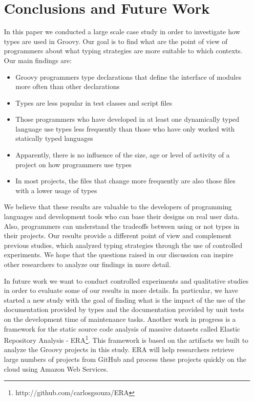 \documentclass[]{sigplanconf}
\begin{document}
\section{Conclusions and Future Work\label{conclusion}}
In this paper we conducted a large scale case study in order to investigate how types are used in Groovy.
Our goal is to find what are the point of view of programmers about what typing strategies are more suitable to which contexts.
Our main findings are:
\begin{itemize}
	\item Groovy programmers type declarations that define the interface of modules more often than other declarations
	\item Types are less popular in test classes and script files
	\item Those programmers who have developed in at least one dynamically typed language use types less frequently than those who have only worked with statically typed languages
	\item Apparently, there is no influence of the size, age or level of activity of a project on how programmers use types
	\item In most projects, the files that change more frequently are also those files with a lower usage of types
\end{itemize}

We believe that these results are valuable to the developers of programming languages and development tools who can base their designs on real user data.
Also, programmers can understand the tradeoffs between using or not types in their projects.
Our results provide a different point of view and complement previous studies, which analyzed typing strategies through the use of controlled experiments. 
We hope that the questions raised in our discussion can inspire other researchers to analyze our findings in more detail.

In future work we want to conduct controlled experiments and qualitative studies in order to evaluate some of our results in more details.
In particular, we have started a new study with the goal of finding what is the impact of the use of the documentation provided by types and the documentation provided by unit tests on the development time of maintenance tasks.
Another work in progress is a framework for the static source code analysis of massive datasets called Elastic Repository Analysis - ERA\footnote{http://github.com/carlosgsouza/ERA}.
This framework is based on the artifacts we built to analyze the Groovy projects in this study.
ERA will help researchers retrieve large numbers of projects from GitHub and process these projects quickly on the cloud using Amazon Web Services.
\end{document}

